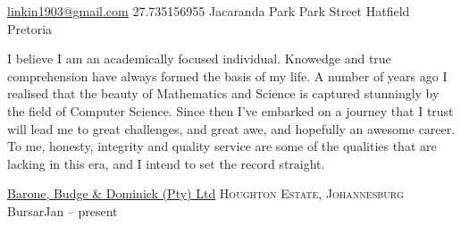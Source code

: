 \sloppy  %



\nobreakvspace{0.3em}  %

\noindent\href{mailto:linkin1903.at.gmail.dot.com}{linkin1903\mbox{}@\mbox{}gmail.com}\sbull
\textsmaller{+}27.735156955 Jacaranda Park Park Street\sbull
Hatfield\sbull
Pretoria\\

\spacedhrule{0.9em}{-0.4em}  %
\begin{center}
\end{center}


\vspace{-1.3em}  %
\begin{multicols}{3}%

\noindent {} I believe I am an academically focused individual. Knowedge and true comprehension have always formed the basis of my life. A number of years ago I realised that the beauty of Mathematics and Science is captured stunningly by the field of Computer Science. Since then I've embarked on a journey that I trust will lead me to great challenges, and great awe, and hopefully an awesome career. To me, honesty, integrity and quality service are some of the qualities that are lacking in this era, and I intend to set the record straight. \\ 

\end{multicols}

\spacedhrule{0em}{-0.4em}


\headedsection
  {\href{http://www.bbd.co.za}{Barone, Budge \& Dominick (Pty) Ltd}}
  {\textsc{Houghton Estate, Johannesburg}} {%
  \headedsubsection
    {Bursar}{Jan -- present}
    {}
    }
    
